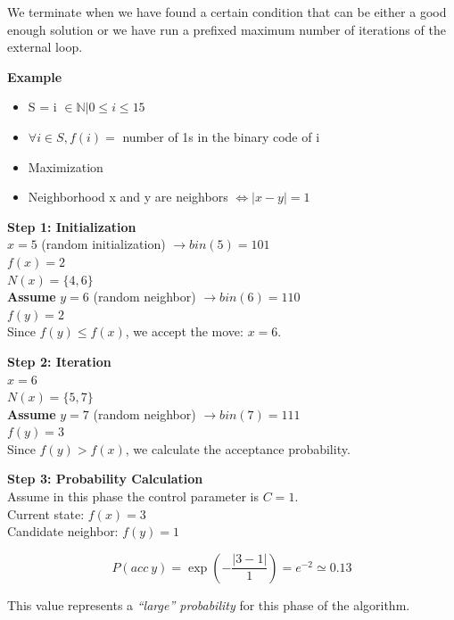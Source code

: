 We terminate when we have found a certain condition that can be either a good enough solution or we have run a prefixed maximum number of iterations of the external loop.

\vspace{10pt}

\textbf{Example}

\begin{itemize}
    \item S = {i $\in \mathbb{N} | 0 \le i \le 15$ }
    \item $\forall i \in S, f(i) = $ number of 1s in the binary code of i
    \item Maximization
    \item Neighborhood \ra x and y are neighbors $\iff |x-y|=1$
\end{itemize}

\noindent
\textbf{Step 1: Initialization} \\
$x = 5$ (random initialization) $\rightarrow bin(5) = 101$ \\
$f(x) = 2$ \\
$N(x) = \{4, 6\}$ \\
\textbf{Assume} $y = 6$ (random neighbor) $\rightarrow bin(6) = 110$ \\
$f(y) = 2$ \\
Since $f(y) \leq f(x)$, we accept the move: $x = 6$.

\vspace{10pt}

\noindent
\textbf{Step 2: Iteration} \\
$x = 6$ \\
$N(x) = \{5, 7\}$ \\
\textbf{Assume} $y = 7$ (random neighbor) $\rightarrow bin(7) = 111$ \\
$f(y) = 3$ \\
Since $f(y) > f(x)$, we calculate the acceptance probability.

\vspace{10pt}

\noindent
\textbf{Step 3: Probability Calculation} \\
Assume in this phase the control parameter is $C = 1$. \\
Current state: $f(x) = 3$ \\
Candidate neighbor: $f(y) = 1$

\[
P(acc \ y) = \exp\left( -\frac{|3 - 1|}{1} \right) = e^{-2} \simeq 0.13
\]

\vspace{5pt}
\noindent
This value represents a \textit{``large'' probability} for this phase of the algorithm.

